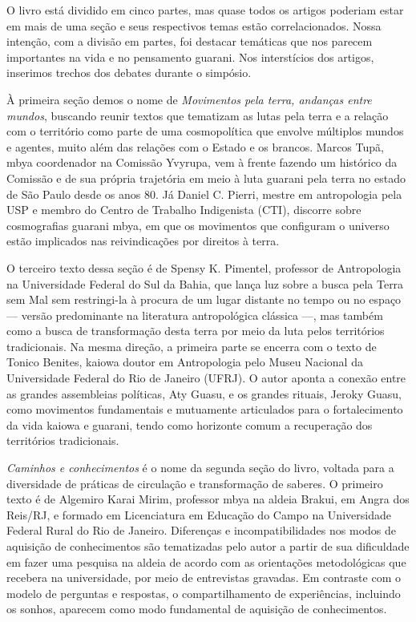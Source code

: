 O livro está dividido em cinco partes, mas quase todos os artigos
poderiam estar em mais de uma seção e seus respectivos temas estão
correlacionados. Nossa intenção, com a divisão em partes, foi destacar
temáticas que nos parecem importantes na vida e no pensamento guarani.
Nos interstícios dos artigos, inserimos trechos dos debates durante o
simpósio.

À primeira seção demos o nome de \emph{Movimentos pela terra, andanças entre
mundos}, buscando reunir textos que tematizam as lutas pela terra e a
relação com o território como parte de uma cosmopolítica que envolve
múltiplos mundos e agentes, muito além das relações com o Estado e os
brancos. Marcos Tupã, mbya coordenador na Comissão Yvyrupa, vem à
frente fazendo um histórico da Comissão e de sua própria trajetória em
meio à luta guarani pela terra no estado de São Paulo desde os anos 80.
Já Daniel C. Pierri, mestre em antropologia pela USP e membro do Centro
de Trabalho Indigenista (CTI), discorre sobre cosmografias guarani
mbya, em que os movimentos que configuram o universo estão implicados
nas reivindicações por direitos à terra.

O terceiro texto dessa seção é de Spensy K. Pimentel, professor de
Antropologia na Universidade Federal do Sul da Bahia, que lança luz
sobre a busca pela Terra sem Mal sem restringi-la à procura de um lugar
distante no tempo ou no espaço — versão predominante na literatura
antropológica clássica —, mas também como a busca de transformação
desta terra por meio da luta pelos territórios tradicionais. Na mesma
direção, a primeira parte se encerra com o texto de Tonico Benites,
kaiowa doutor em Antropologia pelo Museu Nacional da Universidade
Federal do Rio de Janeiro (UFRJ). O autor aponta a conexão entre as
grandes assembleias políticas, Aty Guasu, e os grandes rituais, Jeroky
Guasu, como movimentos fundamentais e mutuamente articulados para o
fortalecimento da vida kaiowa e guarani, tendo como horizonte comum a
recuperação dos territórios tradicionais.

\emph{Caminhos e conhecimentos} é o nome da segunda seção do livro, voltada
para a diversidade de práticas de circulação e transformação de
saberes. O primeiro texto é de Algemiro Karai Mirim, professor mbya na
aldeia Brakui, em Angra dos Reis/RJ, e formado em Licenciatura em
Educação do Campo na Universidade Federal Rural do Rio de Janeiro.
Diferenças e incompatibilidades nos modos de aquisição de conhecimentos
são tematizadas pelo autor a partir de sua dificuldade em fazer uma
pesquisa na aldeia de acordo com as orientações metodológicas que
recebera na universidade, por meio de entrevistas gravadas. Em
contraste com o modelo de perguntas e respostas, o compartilhamento de
experiências, incluindo os sonhos, aparecem como modo fundamental de
aquisição de conhecimentos. 

